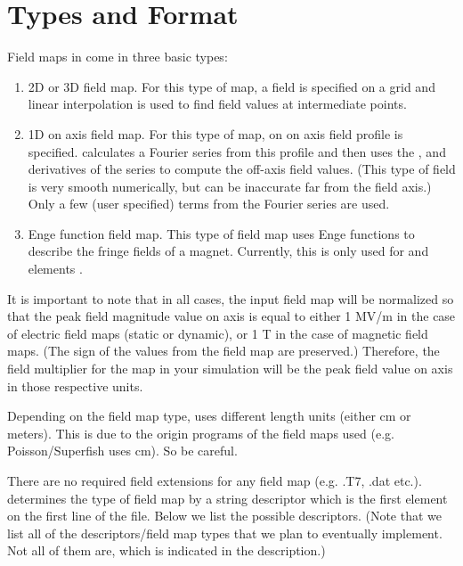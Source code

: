 \section{Types and Format}
\label{sec:fieldmaps}
Field maps in \opalt come in three basic types:

\begin{enumerate}
\item 2D or 3D field map. For this type of map, a field is specified on a grid and linear interpolation is used to find field
  values at intermediate points.
\item 1D on axis field map. For this type of map, on on axis field profile is specified. \opalt calculates a Fourier series
  from this profile and then uses the ,  and  derivatives of the series to
  compute the off-axis field values. (This type of field is very smooth numerically, but can be inaccurate far from the
  field axis.) Only a few (user specified) terms from the Fourier series are used.
\item Enge function \cite{enge} field map. This type of field map uses Enge functions to describe the fringe fields of
  a magnet. Currently, this is only used for  and  elements .
\end{enumerate}
It is important to note that in all cases, the input field map will be normalized so that the peak field magnitude value on axis is equal
to either 1 MV/m in the case of electric field maps (static or dynamic), or 1 T in the case of magnetic field maps. (The sign
of the values from the field map are preserved.) Therefore,
the field multiplier for the map in your simulation will be the peak field value on axis in those respective units.

Depending on the field map type, \opalt uses different length units (either cm or meters). This is due to the origin programs
of the field maps used (e.g. Poisson/Superfish \cite{superfish} uses cm). So be careful.

There are no required field extensions for any \opalt field map (e.g. .T7, .dat etc.). \opalt determines the type of field
map by a string descriptor which is the first element on the first line of the file. Below we list the possible descriptors.
(Note that we list all of the descriptors/field map types that we plan to eventually implement. Not all of them are, which
is indicated in the description.)

